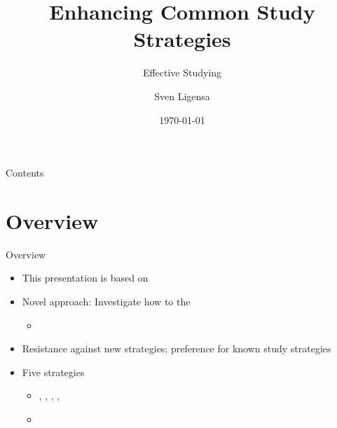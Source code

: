 \documentclass{ercisbeamer}
\title{Enhancing Common Study Strategies}
\subtitle{Effective Studying}
\author{Sven Ligensa}
\institute{European Research Center for Information Systems (ERCIS)}
\date{\today}
\begin{document}
\begin{frame}
    \begin{tbox}
        \titlepage
    \end{tbox}
\end{frame}
\setbgimage{}

\begin{frame}{Contents}
    \tableofcontents
\end{frame}

\section{Overview}
\begin{frame}{Overview}
    \begin{itemize}
        \item This presentation is based on \citet{miyatsu18}
        \item Novel approach: Investigate how to  the 
        \begin{itemize}
            \item {}
        \end{itemize}
        \item Resistance against new strategies; preference for known study strategies
        \item Five strategies
        \begin{itemize}
            \item {}, , , , 
            \item {}
        \end{itemize}
    \end{itemize}
\end{frame}
\end{document}
